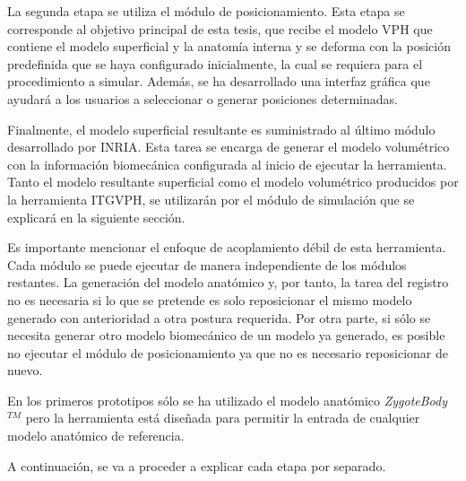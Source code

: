 La segunda etapa se utiliza el módulo de posicionamiento. Esta etapa se corresponde al objetivo principal de esta tesis, que recibe el modelo \ac{VPH} que contiene el modelo superficial y la anatomía interna y se deforma con la posición predefinida que se haya configurado inicialmente, la cual se requiera para el procedimiento a simular. Además, se ha desarrollado una interfaz gráfica que ayudará a los usuarios a seleccionar o generar posiciones determinadas.

Finalmente, el modelo superficial resultante es suministrado al último módulo desarrollado por \ac{INRIA}. Esta tarea se encarga de generar el modelo volumétrico con la información biomecánica configurada al inicio de ejecutar la herramienta.
Tanto el modelo resultante superficial como el modelo volumétrico producidos por la herramienta \ac{ITGVPH}, se utilizarán por el módulo de simulación que se explicará en la siguiente sección.

Es importante mencionar el enfoque de acoplamiento débil de esta herramienta. Cada módulo se puede ejecutar de manera independiente de los módulos restantes. La generación del modelo anatómico y, por tanto, la tarea del registro no es necesaria si lo que se pretende es solo reposicionar el mismo modelo generado con anterioridad a otra postura requerida. Por otra parte, si sólo se necesita generar otro modelo biomecánico de un modelo ya generado, es posible no ejecutar el módulo de posicionamiento ya que no es necesario reposicionar de nuevo.

En los primeros prototipos sólo se ha utilizado el modelo anatómico \emph{ZygoteBody}$^{TM}$ pero la herramienta está diseñada para permitir la entrada de cualquier modelo anatómico de referencia. 

A continuación, se va a proceder a explicar cada etapa por separado.


